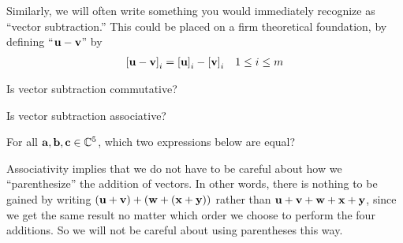 \documentclass{ximera}
\begin{document}
\begin{question}
  Similarly, we will often write something you would immediately
  recognize as ``vector subtraction.''  This could be placed on a firm
  theoretical foundation, by defining ``$\mathbf{u}-\mathbf{v}$'' by
  \begin{align*}
    \left\lbrack\mathbf{u}-\mathbf{v}\right\rbrack_{i}=\left\lbrack\mathbf{u}\right\rbrack_{i}-\left\lbrack\mathbf{v}\right\rbrack_{i}&&1\leq
    i\leq m
  \end{align*}

  Is vector subtraction commutative?
  \begin{multipleChoice}
  \end{multipleChoice}

  Is vector subtraction associative?
  \begin{multipleChoice}
  \end{multipleChoice}

\end{question}

\begin{question}
  For all $\mathbf{a}, \mathbf{b}, \mathbf{c} \in \mathbb{C}^{5}$, which two
  expressions below are equal?
  \begin{selectAll}
  \end{selectAll}
  
  \begin{feedback}
    Associativity implies that we do not have to be careful about how
    we ``parenthesize'' the addition of vectors.  In other words,
    there is nothing to be gained by writing
    $\left(\mathbf{u}+\mathbf{v}\right)+\left(\mathbf{w}+\left(\mathbf{x}+\mathbf{y}\right)\right)$
    rather than $\mathbf{u}+\mathbf{v}+\mathbf{w}+\mathbf{x}+\mathbf{y}$, since
    we get the same result no matter which order we choose to perform
    the four additions.  So we will not be careful about using
    parentheses this way.
\end{feedback}
\end{question}
\end{document}
